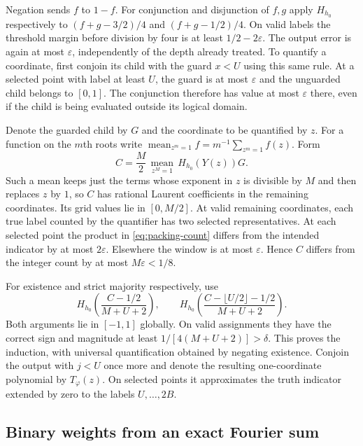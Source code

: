 \documentclass[11pt,letterpaper]{article}
\numberwithin{equation}{section}
\begin{document}
Negation sends $f$ to $1-f$. For conjunction and disjunction of
$f,g$ apply $H_{h_0}$ respectively to $(f+g-3/2)/4$ and
$(f+g-1/2)/4$. On valid labels the threshold margin before division
by four is at least $1/2-2\varepsilon$. The output error is again at
most $\varepsilon$, independently of the depth already treated.
To quantify a coordinate, first conjoin its child with the guard
$x<U$ using this same rule. At a selected point with label at least
$U$, the guard is at most $\varepsilon$ and the unguarded child
belongs to $[0,1]$. The conjunction therefore has value at most
$\varepsilon$ there, even if the child is being evaluated outside
its logical domain.

Denote the guarded child by $G$ and the coordinate to be quantified by
$z$. For a function on the $m$th roots write
$\operatorname{mean}_{z^m=1}f=m^{-1}\sum_{z^m=1}f(z)$. Form
\begin{equation}
 C=\frac M2\,\underset{z^M=1}{\operatorname{mean}}\,
            H_{h_0}(Y(z))G .
 \label{eq:packing-count}
\end{equation}
Such a mean keeps just the terms whose exponent in $z$ is divisible
by $M$ and then replaces $z$ by $1$, so $C$ has rational Laurent
coefficients in the remaining coordinates. Its grid values lie in
$[0,M/2]$. At valid remaining coordinates, each true label counted by
the quantifier has two selected representatives. At each selected
point the product in \eqref{eq:packing-count} differs from the
intended indicator by at most $2\varepsilon$. Elsewhere the window
is at most $\varepsilon$. Hence $C$ differs from the integer count
by at most $M\varepsilon<1/8$.

For existence and strict majority respectively, use
\[
 H_{h_0}\!\left(\frac{C-1/2}{M+U+2}\right),\qquad
 H_{h_0}\!\left(\frac{C-\lfloor U/2\rfloor-1/2}{M+U+2}\right).
\]
Both arguments lie in $[-1,1]$ globally. On valid assignments they
have the correct sign and magnitude at least
$1/[4(M+U+2)]>\delta$. This proves the induction, with universal
quantification obtained by negating existence. Conjoin the output
with $j<U$ once more and denote the resulting one-coordinate
polynomial by $T_\varphi(z)$. On selected points it approximates the
truth indicator extended by zero to the labels $U,\ldots,2B$.

\subsection{Binary weights from an exact Fourier sum}\label{sec:binary-weights}
\end{document}
